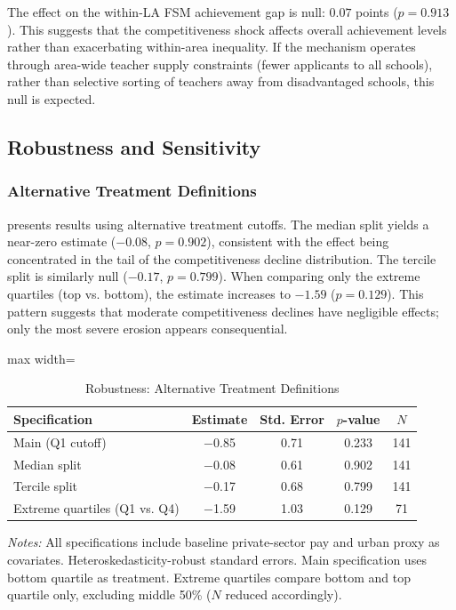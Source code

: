 \documentclass[12pt]{article}
\begin{document}
The effect on the within-LA FSM achievement gap is null: $0.07$ points ($p = 0.913$). This suggests that the competitiveness shock affects overall achievement levels rather than exacerbating within-area inequality. If the mechanism operates through area-wide teacher supply constraints (fewer applicants to all schools), rather than selective sorting of teachers away from disadvantaged schools, this null is expected.

\subsection{Robustness and Sensitivity}\label{sec:robust}

\subsubsection{Alternative Treatment Definitions}

 presents results using alternative treatment cutoffs. The median split yields a near-zero estimate ($-0.08$, $p = 0.902$), consistent with the effect being concentrated in the tail of the competitiveness decline distribution. The tercile split is similarly null ($-0.17$, $p = 0.799$). When comparing only the extreme quartiles (top vs. bottom), the estimate increases to $-1.59$ ($p = 0.129$). This pattern suggests that moderate competitiveness declines have negligible effects; only the most severe erosion appears consequential.

\begin{table}[H]
\centering
\caption{Robustness: Alternative Treatment Definitions}
\label{tab:robust}
\begin{adjustbox}{max width=\textwidth}
\begin{threeparttable}
\begin{tabular}{lcccc}
\toprule
Specification & Estimate & Std. Error & $p$-value & $N$ \\
\midrule
Main (Q1 cutoff) & $-$0.85 & 0.71 & 0.233 & 141 \\
Median split & $-$0.08 & 0.61 & 0.902 & 141 \\
Tercile split & $-$0.17 & 0.68 & 0.799 & 141 \\
Extreme quartiles (Q1 vs. Q4) & $-$1.59 & 1.03 & 0.129 & 71 \\
\bottomrule
\end{tabular}
\begin{tablenotes}[flushleft]
\small
\item \textit{Notes:} All specifications include baseline private-sector pay and urban proxy as covariates. Heteroskedasticity-robust standard errors. Main specification uses bottom quartile as treatment. Extreme quartiles compare bottom and top quartile only, excluding middle 50\% ($N$ reduced accordingly).
\end{tablenotes}
\end{threeparttable}
\end{adjustbox}
\end{table}
\end{document}
